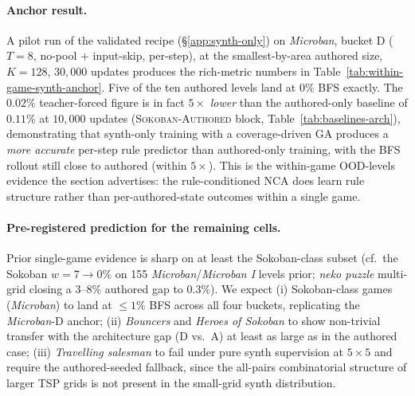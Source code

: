 \paragraph{Anchor result.}
A pilot run of the validated recipe (\S\ref{app:synth-only}) on
\textit{Microban}, bucket D ($T{=}8$, no-pool $+$ input-skip,
per-step), at the smallest-by-area authored size, $K{=}128$,
$30{,}000$ updates produces the rich-metric numbers in
Table~\ref{tab:within-game-synth-anchor}. Five of the ten authored
levels land at $0\%$ BFS exactly. The $0.02\%$ teacher-forced figure
is in fact $5\times$ \emph{lower} than the authored-only baseline
of $0.11\%$ at $10{,}000$ updates (\textsc{Sokoban-Authored} block,
Table~\ref{tab:baselines-arch}), demonstrating that synth-only
training with a coverage-driven GA produces a \emph{more accurate}
per-step rule predictor than authored-only training, with the BFS
rollout still close to authored (within $5\times$). This is the
within-game OOD-levels evidence the section advertises: the
rule-conditioned NCA does learn rule structure rather than
per-authored-state outcomes within a single game.

\begin{table}[t]
  \centering
  \caption{\textbf{Anchor run for the synth-only recipe.} Mean per-cell
    error across all 10 authored \textit{Microban} levels (no level
    enters training).}
  \label{tab:within-game-synth-anchor}
  \small
  
\end{table}

\paragraph{Pre-registered prediction for the remaining cells.}
\label{app:within-game-prediction}
Prior single-game evidence is sharp on at least the Sokoban-class
subset (cf.\ the Sokoban $w{=}7 \to 0\%$ on 155
\textit{Microban}/\textit{Microban I} levels prior;
\textit{neko puzzle} multi-grid closing a $3$--$8\%$ authored gap to
$0.3\%$). We expect (i) Sokoban-class games (\textit{Microban}) to
land at $\leq 1\%$ BFS across all four buckets, replicating the
\textit{Microban}-D anchor; (ii) \textit{Bouncers} and
\textit{Heroes of Sokoban} to show non-trivial transfer with the
architecture gap (D vs.\ A) at least as large as in the authored
case; (iii) \textit{Travelling salesman} to fail under pure synth
supervision at $5{\times}5$ and require the authored-seeded fallback,
since the all-pairs combinatorial structure of larger TSP grids is
not present in the small-grid synth distribution.


